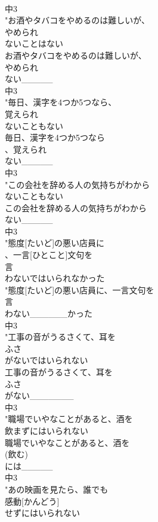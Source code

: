 \documentclass[8pt]{extreport}
\begin{document}
\begin{CJK}{UTF8}{min}
\\	中3
\\	"お酒やタバコをやめるのは難しいが、
\\	やめられ
\\	ないことはない
\\	お酒やタバコをやめるのは難しいが、
\\	やめられ
\\	ない_____
\\	中3
\\	"毎日、漢字を4つか5つなら、
\\	覚えられ
\\	ないこともない
\\	毎日、漢字を4つか5つなら
\\	、覚えられ
\\	ない_____
\\	中3
\\	"この会社を辞める人の気持ちがわから
\\	ないこともない
\\	この会社を辞める人の気持ちがわから
\\	ない_____
\\	中3
\\	"態度[たいど]の悪い店員に
\\	、一言[ひとこと]文句を
\\	言
\\	わないではいられなかった
\\	"態度[たいど]の悪い店員に、一言文句を
\\	言
\\	わない______かった
\\	中3
\\	"工事の音がうるさくて、耳を
\\	ふさ
\\	がないではいられない
\\	工事の音がうるさくて、耳を
\\	ふさ
\\	がない_______
\\	中3
\\	"職場でいやなことがあると、酒を
\\	飲まずにはいられない
\\	職場でいやなことがあると、酒を
\\	(飲む)
\\	には_____
\\	中3
\\	"あの映画を見たら、誰でも
\\	感動[かんどう]
\\	せずにはいられない

\end{CJK}
\end{document}
